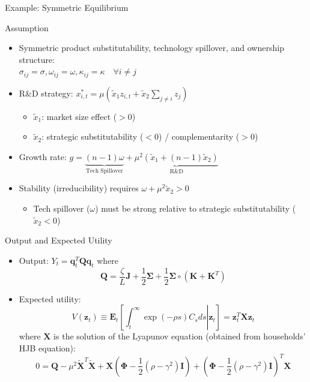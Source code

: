 \documentclass[
  10pt,
  aspectratio=169,   %
]{beamer}
\theoremstyle{plain}
\begin{document}
\begin{frame}{Example: Symmetric Equilibrium}
  \begin{block}{Assumption}
    \label{symmetric}
    \begin{itemize}
      \item Symmetric product substitutability, technology spillover, and ownership structure: \\ $\sigma_{ij} = \sigma, \omega_{ij} = \omega, \kappa_{ij} = \kappa \quad  \forall i \neq j$
    \end{itemize}
  \end{block}
  \begin{itemize}
    \item R\&D strategy:
          $
            x_{i,t}^* = \mu \left( \tilde{x}_1 z_{i,t} + \tilde{x}_2 \sum_{j \neq i} z_j \right)
          $
          \begin{itemize}
            \item $\tilde{x}_1$: market size effect ($>0$)
            \item $\tilde{x}_2$: strategic substitutability ($<0$) / complementarity ($>0$)
          \end{itemize} \medskip{}
    \item Growth rate:
          $g =  \underbrace{(n-1)\omega}_{\text{Tech Spillover}} + \underbrace{\mu^2\left(\tilde{x}_1 + (n-1)\tilde{x}_2\right)}_{\text{R\&D}}$ \medskip{}
    \item Stability (irreducibility) requires
          $\omega + \mu^2 \tilde{x}_2 > 0$
          \begin{itemize}
            \item Tech spillover ($\omega$) must be strong relative to strategic substitutability ($\tilde{x}_2<0$)
          \end{itemize}
  \end{itemize}
  \hyperlink{bgp}{}
\end{frame}

\begin{frame}{Output and Expected Utility}
  \label{X}
  \begin{itemize}
    \item Output: $Y_{t}=\bm{q}_{t}^{T}\bm{Q}\bm{q}_{t}$ where
          \[
            \bm{Q}=\frac{\zeta}{L}\bm{J}+\frac{1}{2}\bm{\Sigma}+\frac{1}{2}\bm{\Sigma}\circ\left(\bm{K}+\bm{K}^{T}\right)
          \]
    \item Expected utility:
          \[
            V\left(\bm{z}_{t}\right)\equiv\bm{E}_{t}\left[\left.\int_{t}^{\infty}\exp\left(-\rho s\right)C_{s}ds\right|\bm{z}_{t}\right]=\bm{z}_{t}^{T}\bm{X}\bm{z}_{t}
          \]
          where $\bm{X}$ is the solution of the Lyapunov equation (obtained from households' HJB equation):
          \[
            0=\bm{Q}-\mu^{2}\tilde{\bm{X}}^{T}\tilde{\bm{X}}+\bm{X}\left(\bm{\Phi}-\frac{1}{2}\left(\rho-\gamma^{2}\right)\bm{I}\right)+\left(\bm{\Phi}-\frac{1}{2}\left(\rho-\gamma^{2}\right)\bm{I}\right)^{T}\bm{X}
          \]
  \end{itemize}
  \hyperlink{aggregation}{}
\end{frame}
\end{document}
